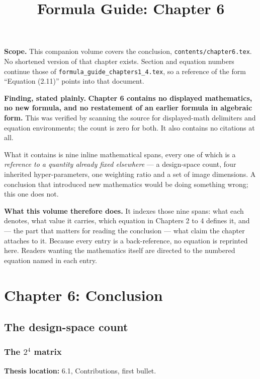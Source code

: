 \documentclass[11pt,a4paper]{article}
\title{Formula Guide: Chapter 6}
\author{}
\date{}
\numberwithin{equation}{section}
\begin{document}
\maketitle

\textbf{Scope.} This companion volume covers the conclusion,
\texttt{contents/chapter6.tex}. No shortened version of that chapter exists.
Section and equation numbers continue those of
\texttt{formula\_guide\_chapters1\_4.tex}, so a reference of the form
``Equation (2.11)'' points into that document.

\textbf{Finding, stated plainly.} \textbf{Chapter 6 contains no displayed
mathematics, no new formula, and no restatement of an earlier formula in
algebraic form.} This was verified by scanning the source for displayed-math
delimiters and equation environments; the count is zero for both. It also
contains no citations at all.

What it contains is nine inline mathematical spans, every one of which is a
\emph{reference to a quantity already fixed elsewhere} --- a design-space
count, four inherited hyper-parameters, one weighting ratio and a set of image
dimensions. A conclusion that introduced new mathematics would be doing
something wrong; this one does not.

\textbf{What this volume therefore does.} It indexes those nine spans: what
each denotes, what value it carries, which equation in Chapters 2 to 4 defines
it, and --- the part that matters for reading the conclusion --- what claim
the chapter attaches to it. Because every entry is a back-reference, no
equation is reprinted here. Readers wanting the mathematics itself are
directed to the numbered equation named in each entry.

\setcounter{section}{5}
\section{Chapter 6: Conclusion}
\label{fg6:chapter6}

\subsection{The design-space count}

\subsubsection{The \texorpdfstring{$2^4$}{2\^{}4} matrix}
\label{fg6:factorial}
\textbf{Thesis location:} 6.1, Contributions, first bullet.
\end{document}
